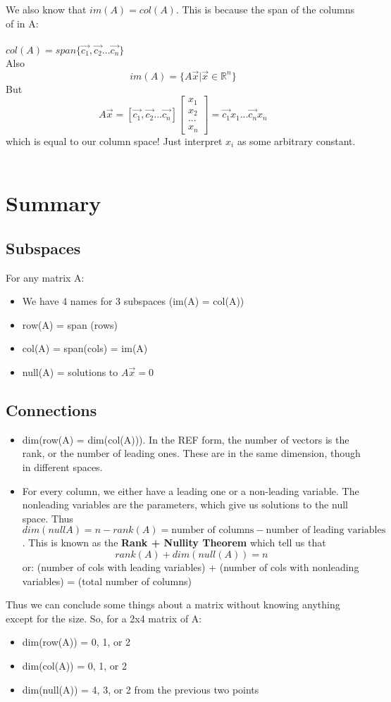 \documentclass[twocolumn,10pt]{article}
\begin{document}
We also know that $im(A) = col(A)$. This is because the span of the columns of in A: \\\\ $col(A) = span\{\vec{c_1}, \vec{c_2}...\vec{c_n}\}$ \\ Also $$im(A) = \{ A\vec{x} | \vec{x} \in \mathbb{R}^n\}$$ But
$$A\vec {x} = [\vec{c_1}, \vec{c_2}...\vec{c_n}]\begin{bmatrix}x_1 \\ x_2 \\ ...\\x_n \end{bmatrix}= \vec{c_1}x_1 ... \vec {c_n}x_n$$ which is equal to our column space! Just interpret $x_i$ as some arbitrary constant. \\\\

\section{Summary}
\subsection{Subspaces}
For any matrix A:
\begin{itemize}
  \item We have 4 names for 3 subspaces (im(A) = col(A))
  \item row(A) = span (rows)
  \item col(A) = span(cols) = im(A)
  \item null(A) = solutions to $A\vec x = 0$
\end{itemize}
\subsection{Connections}
\begin{itemize}
  \item dim(row(A) = dim(col(A))). In the REF form, the number of vectors is the rank, or the number of leading ones.  These are in the same dimension, though in different spaces.
  \item For every column, we either have a leading one or a non-leading variable. The nonleading variables are the parameters, which give us solutions to the null space. Thus $dim(null A) = n - rank(A) = \text{number of columns} - \text{number of leading variables}$. This is known as the \textbf{Rank + Nullity Theorem} which tell us that $$rank(A) + dim(null(A)) = n$$ or: (number of cols with leading variables) + (number of cols with nonleading variables) = (total number of columns)
\end{itemize}
Thus we can conclude some things about a matrix without knowing anything except for the size.
So, for a 2x4 matrix of A: \begin{itemize}
  \item dim(row(A)) = 0, 1, or 2
  \item dim(col(A)) = 0, 1, or 2
  \item dim(null(A)) = 4, 3, or 2 from the previous two points
\end{itemize}
\end{document}
